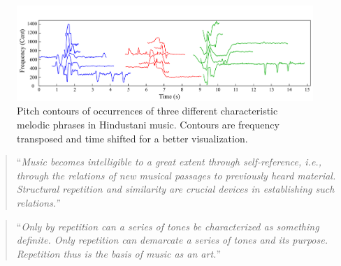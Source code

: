 \begin{figure}
	\begin{center}
		\includegraphics[width=\figSizeHundred]{ch01_introduction/figures/phraseClassesExample.pdf}
	\end{center}
	\caption{Pitch contours of occurrences of three different characteristic melodic phrases in Hindustani music. Contours are frequency transposed and time shifted for a better visualization.}
	\label{fig:phraseComplexityExample_intro}
\end{figure}

\blockcquote[]{Cambouropoulos2006}{``\textit{Music becomes intelligible to a great extent through self-reference, i.e., through the relations of new musical passages to previously heard material. Structural repetition and similarity are crucial devices in establishing such relations.''}}

\blockcquote[]{schenker1980harmony}{``\textit{Only by repetition can a series of tones be characterized as something definite. Only repetition can demarcate a series of tones and its purpose. Repetition thus is the basis of music as an art.}''}

